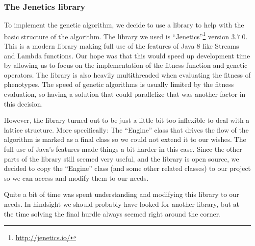 \subsubsection{The Jenetics library}
To implement the genetic algorithm, we decide to use a library to help with the basic structure of the algorithm. The library we used is ``Jenetics''\footnote{\url{http://jenetics.io/}} version 3.7.0. This is a modern library making full use of the features of Java 8 like Streams and Lambda functions. Our hope was that this would speed up development time by allowing us to focus on the implementation of the fitness function and genetic operators. The library is also heavily multithreaded when evaluating the fitness of phenotypes. The speed of genetic algorithms is usually limited by the fitness evaluation, so having a solution that could parallelize that was another factor in this decision.
\par
However, the library turned out to be just a little bit too inflexible to deal with a lattice structure. More specifically: The ``Engine'' class that drives the flow of the algorithm is marked as a final class so we could not extend it to our wishes. The full use of Java's features made things a bit harder in this case. Since the other parts of the library still seemed very useful, and the library is open source, we decided to copy the ``Engine'' class (and some other related classes) to our project so we can access and modify them to our needs. 
\par
Quite a bit of time was spent understanding and modifying this library to our needs. In hindsight we should probably have looked for another library, but at the time solving the final hurdle always seemed right around the corner.

